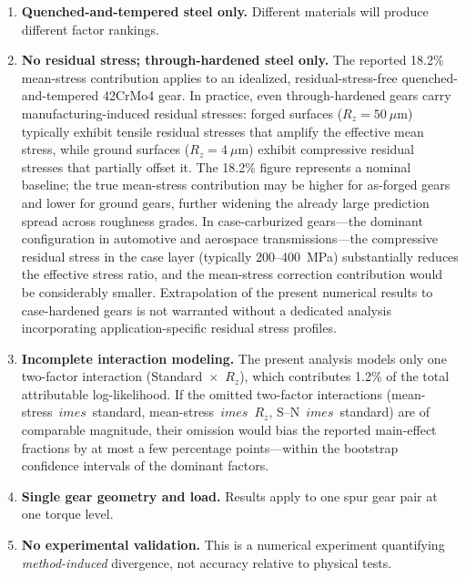 \documentclass[twocolumn,12pt,a4paper]{article}
\begin{document}
\begin{enumerate}
  \item \textbf{Quenched-and-tempered steel only.} Different materials
        will produce different factor rankings.
  \item \textbf{No residual stress; through-hardened steel only.} The
        reported 18.2\% mean-stress contribution applies to an idealized,
        residual-stress-free quenched-and-tempered 42CrMo4 gear. In
        practice, even through-hardened gears carry manufacturing-induced
        residual stresses: forged surfaces ($R_z=50~\mu$m) typically
        exhibit tensile residual stresses that amplify the effective mean
        stress, while ground surfaces ($R_z=4~\mu$m) exhibit compressive
        residual stresses that partially offset it. The 18.2\% figure
        represents a nominal baseline; the true mean-stress
        contribution may be higher for as-forged gears and lower for
        ground gears, further widening the already large prediction spread
        across roughness grades. In case-carburized gears---the dominant
        configuration in automotive and aerospace transmissions---the
        compressive residual stress in the case layer (typically
        200--400~MPa) substantially reduces the effective stress ratio,
        and the mean-stress correction contribution would be considerably
        smaller. Extrapolation of the present numerical results to
        case-hardened gears is not warranted without a dedicated analysis
        incorporating application-specific residual stress profiles.
  \item \textbf{Incomplete interaction modeling.} The present analysis
        models only one two-factor interaction (Standard~$\times$~$R_z$), which contributes 1.2\% of the total attributable log-likelihood. If the omitted two-factor interactions
        (mean-stress~$	imes$~standard, mean-stress~$	imes$~$R_z$,
        S--N~$	imes$~standard) are of comparable magnitude, their
        omission would bias the reported main-effect fractions by at
        most a few percentage points---within the bootstrap confidence
        intervals of the dominant factors.
  \item \textbf{Single gear geometry and load.} Results apply to one spur
        gear pair at one torque level.
  \item \textbf{No experimental validation.} This is a numerical
        experiment quantifying \emph{method-induced} divergence, not
        accuracy relative to physical tests.
\end{enumerate}
\end{document}
